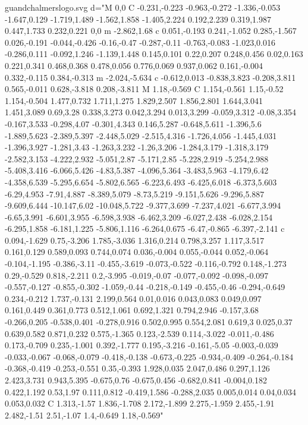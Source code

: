 \begin{filecontents}[noheader]{guandchalmerslogo.svg}
			   d="M 0,0 C -0.231,-0.223 -0.963,-0.272 -1.336,-0.053 -1.647,0.129 -1.719,1.489 -1.562,1.858 -1.405,2.224 0.192,2.239 0.319,1.987 0.447,1.733 0.232,0.221 0,0 m -2.862,1.68 c 0.051,-0.193 0.241,-1.052 0.285,-1.567 0.026,-0.191 -0.044,-0.426 -0.16,-0.47 -0.287,-0.11 -0.763,-0.083 -1.023,0.016 -0.286,0.111 -0.092,1.246 -1.139,1.448 0.145,0.101 0.22,0.207 0.248,0.456 0.02,0.163 0.221,0.341 0.468,0.368 0.478,0.056 0.776,0.069 0.937,0.062 0.161,-0.004 0.332,-0.115 0.384,-0.313 m -2.024,-5.634 c -0.612,0.013 -0.838,3.823 -0.208,3.811 0.565,-0.011 0.628,-3.818 0.208,-3.811 M 1.18,-0.569 C 1.154,-0.561 1.15,-0.52 1.154,-0.504 1.477,0.732 1.711,1.275 1.829,2.507 1.856,2.801 1.644,3.041 1.451,3.089 0.69,3.28 0.338,3.273 0.042,3.294 0.013,3.299 -0.059,3.312 -0.08,3.354 -0.167,3.533 -0.298,4.07 -0.301,4.343 0.146,5.287 -0.648,5.611 -1.396,5.6 -1.889,5.623 -2.389,5.397 -2.448,5.029 -2.515,4.316 -1.726,4.056 -1.445,4.031 -1.396,3.927 -1.281,3.43 -1.263,3.232 -1.26,3.206 -1.284,3.179 -1.318,3.179 -2.582,3.153 -4.222,2.932 -5.051,2.87 -5.171,2.85 -5.228,2.919 -5.254,2.988 -5.408,3.416 -6.066,5.426 -4.83,5.387 -4.096,5.364 -3.483,5.963 -4.179,6.42 -4.358,6.539 -5.295,6.654 -5.802,6.565 -6.223,6.493 -6.425,6.018 -6.373,5.603 -6.29,4.953 -7.91,4.887 -8.389,5.079 -8.73,5.219 -9.151,5.626 -9.296,5.887 -9.609,6.444 -10.147,6.02 -10.048,5.722 -9.377,3.699 -7.237,4.021 -6.677,3.994 -6.65,3.991 -6.601,3.955 -6.598,3.938 -6.462,3.209 -6.027,2.438 -6.028,2.154 -6.295,1.858 -6.181,1.225 -5.806,1.116 -6.264,0.675 -6.47,-0.865 -6.397,-2.141 c 0.094,-1.629 0.75,-3.206 1.785,-3.036 1.316,0.214 0.798,3.257 1.117,3.517 0.161,0.129 0.589,0.093 0.744,0.074 0.036,-0.004 0.055,-0.044 0.052,-0.064 -0.104,-1.195 -0.386,-3.11 -0.455,-3.619 -0.073,-0.522 -0.116,-0.792 0.148,-1.273 0.29,-0.529 0.818,-2.211 0.2,-3.995 -0.019,-0.07 -0.077,-0.092 -0.098,-0.097 -0.557,-0.127 -0.855,-0.302 -1.059,-0.44 -0.218,-0.149 -0.455,-0.46 -0.294,-0.649 0.234,-0.212 1.737,-0.131 2.199,0.564 0.01,0.016 0.043,0.083 0.049,0.097 0.161,0.449 0.361,0.773 0.512,1.061 0.692,1.321 0.794,2.946 -0.157,3.68 -0.266,0.205 -0.538,0.401 -0.278,0.916 0.502,0.995 0.554,2.081 0.619,3 0.025,0.37 0.639,0.582 0.871,0.232 0.575,-1.365 0.123,-2.539 0.114,-3.022 -0.011,-0.486 0.173,-0.709 0.235,-1.001 0.392,-1.777 0.195,-3.216 -0.161,-5.05 -0.003,-0.039 -0.033,-0.067 -0.068,-0.079 -0.418,-0.138 -0.673,-0.225 -0.934,-0.409 -0.264,-0.184 -0.368,-0.419 -0.253,-0.551 0.35,-0.393 1.928,0.035 2.047,0.486 0.297,1.126 2.423,3.731 0.943,5.395 -0.675,0.76 -0.675,0.456 -0.682,0.841 -0.004,0.182 0.422,1.192 0.53,1.97 0.111,0.812 -0.419,1.586 -0.288,2.035 0.005,0.014 0.04,0.034 0.053,0.032 C 1.313,-1.57 1.836,-1.708 2.172,-1.899 2.275,-1.959 2.455,-1.91 2.482,-1.51 2.51,-1.07 1.4,-0.649 1.18,-0.569"

\end{filecontents}
